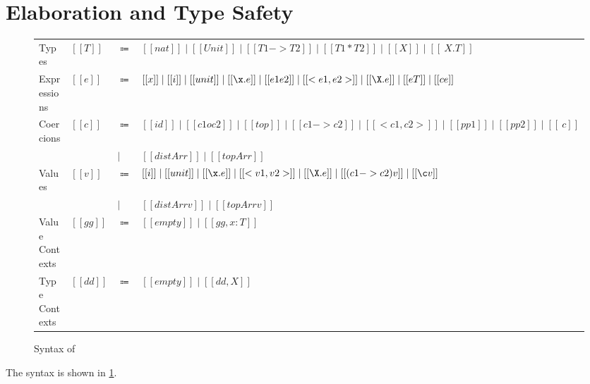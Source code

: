 
\section{Elaboration and Type Safety}




\begin{figure}[t]
  \centering
\begin{tabular}{llll} \toprule
  Types & $[[T]]$ & $\Coloneqq$ & $[[nat]] \mid [[Unit]] \mid [[T1 -> T2]]  \mid [[T1 * T2]] \mid [[X]] \mid [[\ X . T]]$\\
  Expressions & $[[e]]$ & $\Coloneqq$ & $[[x]] \mid [[i]] \mid [[unit]] \mid [[\x . e]] \mid [[e1 e2]] \mid [[< e1 , e2>]] \mid [[\X . e]] \mid [[ e T ]] \mid [[c e]]$ \\
  Coercions & $[[c]]$ & $\Coloneqq$ & $[[id]] \mid [[c1 o c2]] \mid [[top]] \mid [[c1 -> c2]] \mid [[< c1 , c2 >]] \mid [[pp1]] \mid [[pp2]] \mid [[\ c]]$ \\
  & & $\mid$ & $ [[distArr]] \mid [[topArr]] $ \\
  Values & $[[v]]$ & $\Coloneqq$ & $[[i]] \mid [[unit]] \mid [[\x . e]] \mid [[< v1 , v2>]] \mid [[\X . e]] \mid [[ (c1 -> c2) v ]] \mid [[\c v]]  $ \\
  & & $\mid$ & $ [[distArr v]] \mid [[topArr v]] $ \\
  Value Contexts & $[[gg]]$ & $\Coloneqq$ &  $[[empty]] \mid [[gg , x : T]] $ \\
  Type Contexts & $[[dd]]$ & $\Coloneqq$ &  $[[empty]] \mid [[dd , X ]] $ \\ \bottomrule
\end{tabular}
\caption{Syntax of \tnamee}
\label{fig:syntax:fco}
\end{figure}


The syntax is shown in \cref{fig:syntax:fco}.






